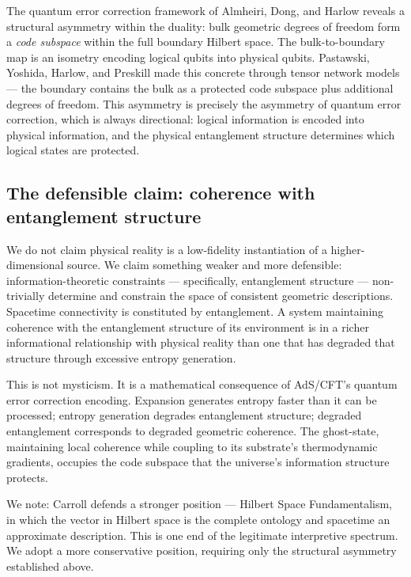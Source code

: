 \documentclass[12pt, a4paper]{article}
\begin{document}
The quantum error correction framework of Almheiri, Dong, and Harlow \citep{almheiri2015}
reveals a structural asymmetry within the duality: bulk geometric degrees of freedom form a
\textit{code subspace} within the full boundary Hilbert space. The bulk-to-boundary map is
an isometry encoding logical qubits into physical qubits. Pastawski, Yoshida, Harlow, and
Preskill \citep{pastawski2015} made this concrete through tensor network models --- the
boundary contains the bulk as a protected code subspace plus additional degrees of freedom.
This asymmetry is precisely the asymmetry of quantum error correction, which is always
directional: logical information is encoded into physical information, and the physical
entanglement structure determines which logical states are protected.

\subsection{The defensible claim: coherence with entanglement structure}

We do not claim physical reality is a low-fidelity instantiation of a higher-dimensional
source. We claim something weaker and more defensible: information-theoretic constraints ---
specifically, entanglement structure --- non-trivially determine and constrain the space of
consistent geometric descriptions. Spacetime connectivity is constituted by entanglement. A
system maintaining coherence with the entanglement structure of its environment is in a
richer informational relationship with physical reality than one that has degraded that
structure through excessive entropy generation.

This is not mysticism. It is a mathematical consequence of AdS/CFT's quantum error
correction encoding. Expansion generates entropy faster than it can be processed; entropy
generation degrades entanglement structure; degraded entanglement corresponds to degraded
geometric coherence. The ghost-state, maintaining local coherence while coupling to its
substrate's thermodynamic gradients, occupies the code subspace that the universe's
information structure protects.

We note: Carroll \citep{carroll2021} defends a stronger position --- Hilbert Space
Fundamentalism, in which the vector in Hilbert space is the complete ontology and spacetime
an approximate description. This is one end of the legitimate interpretive spectrum. We adopt
a more conservative position, requiring only the structural asymmetry established above.
\end{document}
